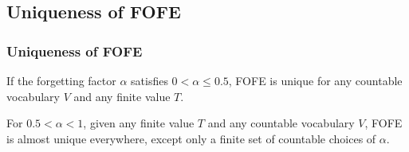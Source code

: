 \documentclass{beamer}
\begin{document}
\subsection{Uniqueness of FOFE}

\begin{frame}
\frametitle{Uniqueness of FOFE}
\begin{theorem}
	If the forgetting factor $\alpha$ satisfies $0 < \alpha \leq 0.5$, 
	FOFE is unique for any countable vocabulary $V$ and any finite value $T$.
\end{theorem}
\begin{theorem}
	For $0.5 < \alpha < 1 $, given any finite value $T$ and any countable vocabulary $V$,
	FOFE is almost unique everywhere, except only a finite set of countable choices of $\alpha$.
\end{theorem}
\end{frame}
\end{document}
